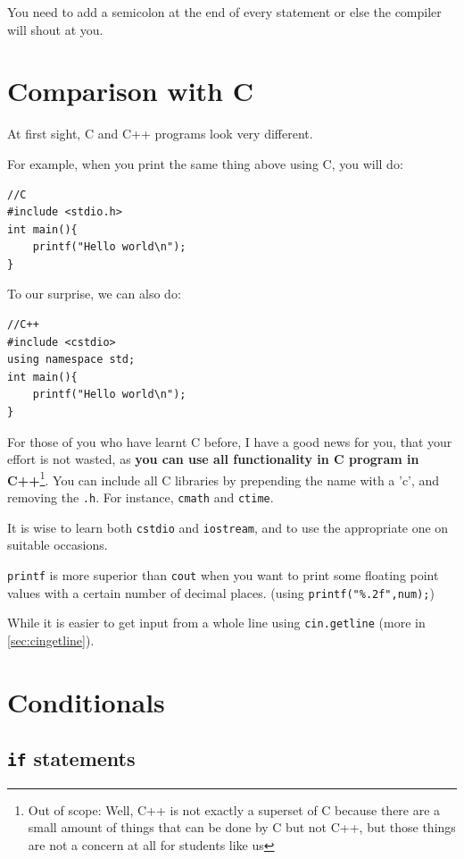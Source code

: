 You need to add a semicolon at the end of every statement or else the compiler will shout at you. 

\section{Comparison with C}

At first sight, C and C++ programs look very different.

For example, when you print the same thing above using C, you will do:

\begin{lstlisting}
//C
#include <stdio.h> 
int main(){
    printf("Hello world\n");
}
\end{lstlisting}

To our surprise, we can also do:

\begin{lstlisting}
//C++
#include <cstdio>
using namespace std;
int main(){
    printf("Hello world\n");
}
\end{lstlisting}

For those of you who have learnt C before, I have a good news for you, that your effort is not wasted, as \textbf{you can use all functionality in C program in C++}\footnote{Out of scope: Well, C++ is not exactly a superset of C because there are a small amount of things that can be done by C but not C++, but those things are not a concern at all for students like us}. You can include all C libraries by prepending the name with a 'c', and removing the \texttt{.h}. For instance, \texttt{cmath} and \texttt{ctime}.
\vspace{6mm}

It is wise to learn both \texttt{cstdio} and \texttt{iostream}, and to use the appropriate one on suitable occasions.

\texttt{printf} is more superior than \texttt{cout} when you want to print some floating point values with a certain number of decimal places. (using \texttt{printf("\%.2f",num);})

While it is easier to get input from a whole line using \texttt{cin.getline} (more in \cref{sec:cingetline}).

\section{Conditionals}
\subsection{\texttt{if} statements}

